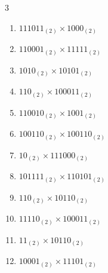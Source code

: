 \begin{multicols}{3}
\begin{enumerate}

  \item $111011_{(2)} \times 1000_{(2)}$


  \item $110001_{(2)} \times 11111_{(2)}$


  \item $1010_{(2)} \times 10101_{(2)}$


\columnbreak %

\resetques

  \item $110_{(2)} \times 100011_{(2)}$


  \item $110010_{(2)} \times 1001_{(2)}$


  \item $100110_{(2)} \times 100110_{(2)}$


  \item $10_{(2)} \times 111000_{(2)}$


  \item $101111_{(2)} \times 110101_{(2)}$


\columnbreak %

  \item $110_{(2)} \times 10110_{(2)}$


  \item $11110_{(2)} \times 100011_{(2)}$


  \item $11_{(2)} \times 10110_{(2)}$


  \item $10001_{(2)} \times 11101_{(2)}$



\end{enumerate}
\end{multicols}
